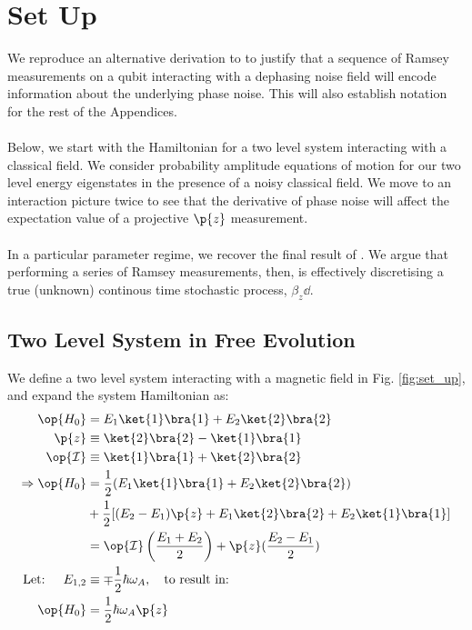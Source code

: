 \section{Set Up}\label{ap:ap_setup}
 We reproduce an alternative derivation to \cite{soare} to justify that a sequence of Ramsey measurements on a qubit interacting with a dephasing noise field will encode information about the underlying phase noise. This will also establish notation for the rest of the Appendices. 
 \\
 \\
Below, we start with the Hamiltonian for a two level system interacting with a classical field. We consider probability amplitude equations of motion for our two level energy eigenstates in the presence of a noisy classical field. We move to an interaction picture twice to see that the derivative of phase noise will affect the expectation value of a projective $\p{z}$ measurement. 
\\
\\
In a particular parameter regime, we recover the final result of \cite{soare}. We argue that performing a series of Ramsey measurements, then, is effectively discretising a true (unknown) continous time stochastic process, $\beta_z \dd $.

\subsection{Two Level System in Free Evolution}

We define a two level system interacting with a magnetic field in Fig. \ref{fig:set_up}, and expand the system Hamiltonian as: 
\\
\begin{align}
\op{H_0} &= E_1\ket{1}\bra{1} + E_2\ket{2}\bra{2} \\
\p{z} &\equiv \ket{2}\bra{2} - \ket{1}\bra{1} \\
\op{\mathcal{I}} & \equiv \ket{1}\bra{1} + \ket{2}\bra{2} \\
\Rightarrow \op{H_0} & = \frac{1}{2} (E_1\ket{1}\bra{1}+ E_2\ket{2}\bra{2}) \\
& + \frac{1}{2} [(E_2 - E_1)\p{z} + E_1 \ket{2}\bra{2} + E_2 \ket{1}\bra{1}]\\
& = \op{\mathcal{I}} \left( \frac{E_1 + E_2}{2} \right) + \p{z}(\frac{E_2 - E_1}{2}) \\
\text{Let: } \quad E_{1,2} &\equiv \mp \frac{1}{2} \hbar \omega_A, \quad \text{to result in:} \\
\op{H_0} &= \frac{1}{2} \hbar \omega_A \p{z}
\end{align}
\\
\\
